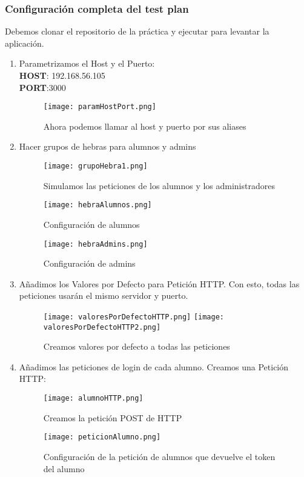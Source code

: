 \subsubsection{Configuración completa del test plan}
Debemos clonar el repositorio de la práctica \cite{repoISE} y ejecutar  para levantar la aplicación.
\begin{enumerate}
	\item Parametrizamos el Host y el Puerto: \\
	\textbf{HOST}: 192.168.56.105 \\
	\textbf{PORT}:3000
	\begin{figure}[H]
		\centering
		\texttt{[image: paramHostPort.png]}
		\caption{Ahora podemos llamar al host y puerto por sus aliases}
	\end{figure}

	\item Hacer grupos de hebras para alumnos y admins
	
	\begin{figure}[H]
		\centering
		\texttt{[image: grupoHebra1.png]}
		\caption{Simulamos las peticiones de los alumnos y los administradores}
	\end{figure}
	\begin{figure}[H]
		\centering
		\texttt{[image: hebraAlumnos.png]}
		\caption{Configuración de alumnos}
	\end{figure}
	\begin{figure}[H]
		\centering
		\texttt{[image: hebraAdmins.png]}
		\caption{Configuración de admins}
	\end{figure}
	
	\item Añadimos los Valores por Defecto para Petición HTTP. Con esto, todas las peticiones usarán el mismo servidor y puerto.
	\begin{figure}[H]
		\centering
		\texttt{[image: valoresPorDefectoHTTP.png]}
		\texttt{[image: valoresPorDefectoHTTP2.png]}
		\caption{Creamos valores por defecto a todas las peticiones}
	\end{figure}

	\item Añadimos las peticiones de login de cada alumno. Creamos una Petición HTTP:
	\begin{figure}[H]
		\centering
		\texttt{[image: alumnoHTTP.png]}
		\caption{Creamos la petición POST de HTTP}
	\end{figure}
	\begin{figure}[H]
		\centering
		\texttt{[image: peticionAlumno.png]}
		\caption{Configuración de la petición de alumnos que devuelve el token del alumno}
	\end{figure}


\end{enumerate}
